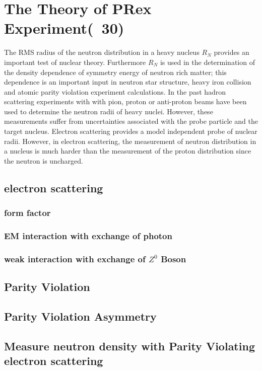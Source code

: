 \chapter{The Theory of PRex Experiment(~30)}

The RMS radius of the  neutron distribution in a heavy nucleus  $R_N$ provides an important test of nuclear theory. Furthermore   $R_N$ is used in the determination of  the density dependence of symmetry energy of neutron rich matter; this dependence is an  important input in   neutron star structure, heavy iron collision and atomic parity violation experiment calculations. In the past hadron scattering experiments with with pion, proton or anti-proton beams have been used to determine the neutron radii of heavy nuclei. However, these measurements suffer from uncertainties associated with the probe particle and the target nucleus. Electron scattering provides a model independent probe of nuclear radii.  However, in electron scattering, the measurement of neutron distribution in a nucleus  is much harder than the measurement of the proton distribution  since the neutron is uncharged. 

\section{electron scattering}
\subsection{form factor}
\subsection{EM interaction with exchange of photon}
\subsection{weak interaction with exchange of $Z^0$ Boson}
\section{Parity Violation}
\section{Parity Violation Asymmetry}
\section{Measure neutron density with Parity Violating electron scattering}
